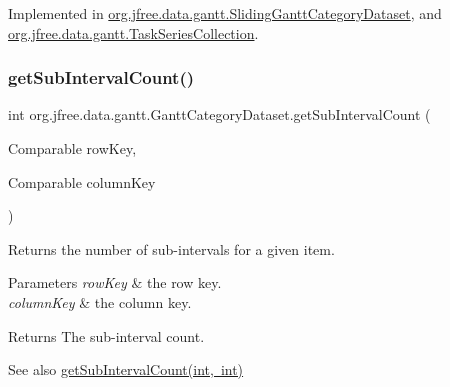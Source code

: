 Implemented in \mbox{\hyperlink{classorg_1_1jfree_1_1data_1_1gantt_1_1_sliding_gantt_category_dataset_a2d8acd9a0033c1e36ae217dc067931b7}{org.\+jfree.\+data.\+gantt.\+Sliding\+Gantt\+Category\+Dataset}}, and \mbox{\hyperlink{classorg_1_1jfree_1_1data_1_1gantt_1_1_task_series_collection_a9172210b4a2939c4a0ffa073a11f0792}{org.\+jfree.\+data.\+gantt.\+Task\+Series\+Collection}}.

\mbox{\label{interfaceorg_1_1jfree_1_1data_1_1gantt_1_1_gantt_category_dataset_af4749dc6ab0b5b67535b4ea0fa88f190}} 
\subsubsection{\texorpdfstring{get\+Sub\+Interval\+Count()}{getSubIntervalCount()}\hspace{0.1cm}{\footnotesize\ttfamily [2/2]}}
{\footnotesize\ttfamily int org.\+jfree.\+data.\+gantt.\+Gantt\+Category\+Dataset.\+get\+Sub\+Interval\+Count (\begin{DoxyParamCaption}\item[{Comparable}]{row\+Key,  }\item[{Comparable}]{column\+Key }\end{DoxyParamCaption})}

Returns the number of sub-\/intervals for a given item.


\begin{DoxyParams}{Parameters}
{\em row\+Key} & the row key. \\
\hline
{\em column\+Key} & the column key.\\
\hline
\end{DoxyParams}
\begin{DoxyReturn}{Returns}
The sub-\/interval count.
\end{DoxyReturn}
\begin{DoxySeeAlso}{See also}
\mbox{\hyperlink{interfaceorg_1_1jfree_1_1data_1_1gantt_1_1_gantt_category_dataset_a290ee496bed2a6688f43e56c0824bb01}{get\+Sub\+Interval\+Count(int, int)}} 
\end{DoxySeeAlso}


